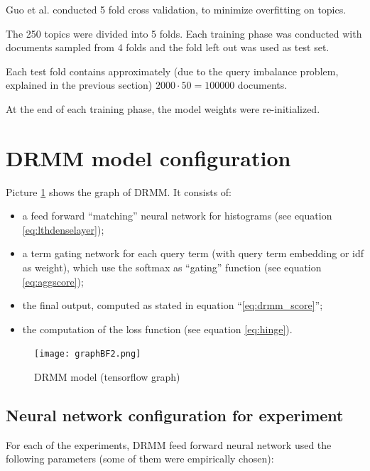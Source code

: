 Guo et al. conducted 5 fold cross validation, to minimize overfitting on topics.

The 250 topics were divided into 5 folds. Each training phase was conducted with documents sampled from 4 folds and the fold left out was used as test set.

Each test fold contains approximately (due to the query imbalance problem, explained in the previous section) $2000 \cdot 50 = 100000$ documents.

At the end of each training phase, the model weights were re-initialized.

\section{DRMM model configuration}

Picture \ref{fig:model_drmm} shows the graph of DRMM. It consists of:

\begin{itemize}
 \item a feed forward ``matching'' neural network for histograms (see equation \ref{eq:lthdenselayer});
 \item a term gating network for each query term (with query term embedding or idf as weight), which use the softmax as ``gating'' function (see equation \ref{eq:aggscore});
 \item the final output, computed as stated in equation ``\ref{eq:drmm_score}'';
 \item the computation of the loss function (see equation \ref{eq:hinge}).
\end{itemize}

\begin{figure}[H]
  \centering
  \texttt{[image: graphBF2.png]}
  \caption{DRMM model (tensorflow graph)}
  \label{fig:model_drmm}
\end{figure}

\subsection{Neural network configuration for experiment}

For each of the experiments, DRMM feed forward neural network used the following parameters (some of them were empirically chosen):

